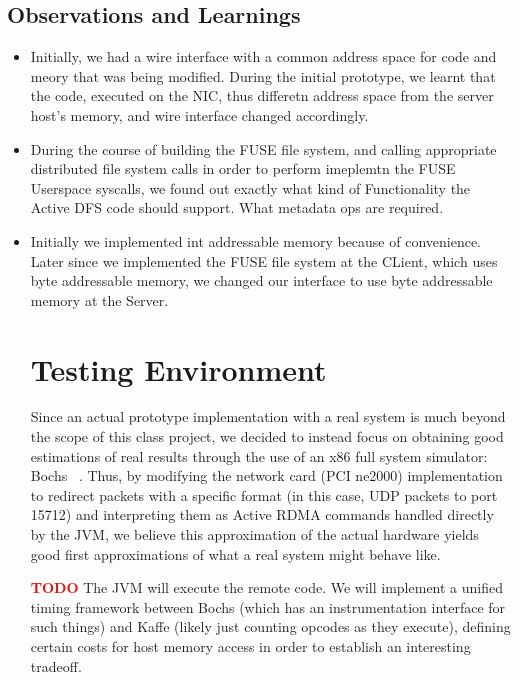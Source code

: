 \documentclass[10pt]{article}
\newcommand{\PROBLEM}[1] {\textbf{\textcolor{red}{#1}}}
\begin{document}
\subsection{Observations and Learnings}
\begin{itemize}
\item Initially, we had a wire interface with a common address space for code and meory that was being modified. During the initial prototype, we learnt that the code, executed on the NIC, thus 
differetn address space from the server host's memory, and wire interface changed accordingly.
\item During the course of building the FUSE file system, and calling appropriate distributed  file system calls in order to perform imeplemtn the FUSE Userspace syscalls, we found out exactly what kind of Functionality the Active DFS code should support. What metadata ops are required.
\item Initially we implemented int addressable memory because of convenience. Later since we implemented the FUSE file system at the CLient, which uses byte addressable memory, we changed our interface to use byte addressable memory at the Server.

\section{Testing Environment}

Since an actual prototype implementation with a real system is much beyond the scope of this class project, we decided to instead focus on obtaining good estimations of real results through the use of an x86 full system simulator: Bochs ~\cite{bochs}. Thus, by modifying the network card (PCI ne2000) implementation to redirect packets with a specific format (in this case, UDP packets to port 15712) and interpreting them as Active RDMA commands handled directly by the JVM, we believe this approximation of the actual hardware yields good first approximations of what a real system might behave like.

%  
  
  \PROBLEM{TODO}
  The JVM will execute the remote code. We will implement a
  unified timing framework between Bochs (which has an instrumentation
  interface for such things) and Kaffe (likely just counting opcodes
  as they execute), defining certain costs for host memory access in
  order to establish an interesting tradeoff. 
  

\end{itemize}
\end{document}
